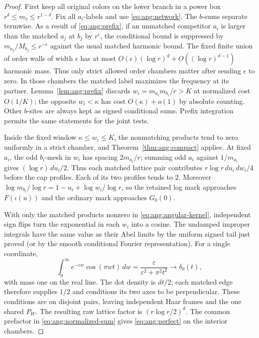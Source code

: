 \begin{proof}
First keep all original colors on the lower branch in a power box \(r^\delta\leq m_v\leq r^{1-\delta}\). Fix all \(a_i\)-labels and use \eqref{eq:ang:network}. The \(b\)-sums separate termwise. As a result of \eqref{eq:ang:prefix}, if an unmatched competitor \(a_i\) is larger than the matched \(a_j\) at \(b_j\) by \(r^\epsilon\), the conditional bound is suppressed by \(m_{a_j}/M_{b_j}\leq r^{-\epsilon}\) against the usual matched harmonic bound. The fixed finite union of order walls of width \(\epsilon\) has at most \(O(\epsilon)(\log r)^d+O((\log r)^{d-1})\) harmonic mass. Thus only strict allowed order chambers matter after sending \(\epsilon\) to zero. In those chambers the matched label maximizes the frequency at its partner. Lemma~\ref{lem:ang:prefix} discards \(w_i=m_{a_i}m_{b_i}/r>K\) at normalized cost \(O(1/K)\); the opposite \(w_i<\kappa\) has cost \(O(\kappa)+o(1)\) by absolute counting. Other \(b\)-sites are always kept as signed conditional sums. Prefix integration permits the same statements for the joint tests.

Inside the fixed window \(\kappa\leq w_i\leq K\), the nonmatching products tend to zero uniformly in a strict chamber, and Theorem~\ref{thm:ang:compact} applies. At fixed \(a_i\), the odd \(b_i\)-mesh in \(w_i\) has spacing \(2m_{a_i}/r\); summing odd \(a_i\) against \(1/m_{a_i}\) gives \((\log r)\,du_i/2\). Thus each matched lattice pair contributes \(r\log r\,du_i\,dw_i/4\) before the cap profiles. Each of its two profiles tends to \(2\). Moreover \(\log m_{b_i}/\log r=1-u_i+\log w_i/\log r\), so the retained log mark approaches \(F(\iota(u))\) and the ordinary mark approaches \(G_0(0)\).

With only the matched products nonzero in \eqref{eq:ang:angular-kernel}, independent sign flips turn the exponential in each \(w_i\) into a cosine. The undamped improper integrals have the same value as their Abel limits by the uniform signed tail just proved (or by the smooth conditional Fourier representation). For a single coordinate,
\[
       \int_0^\infty e^{-\varepsilon w}\cos(\pi wt)\,dw
             =\frac{\varepsilon}{\varepsilon^2+\pi^2t^2}
                          \longrightarrow\delta_0(t),
\]
with mass one on the real line. The dot density is \(dt/2\); each matched edge therefore supplies \(1/2\) and conditions its two axes to be perpendicular. These conditions are on disjoint pairs, leaving independent Haar frames and the one shared \(P_W\). The resulting raw lattice factor is \((r\log r/2)^d\). The common prefactor in \eqref{eq:ang:normalized-sum} gives \eqref{eq:ang:perfect} on the interior chambers.


\end{proof}
